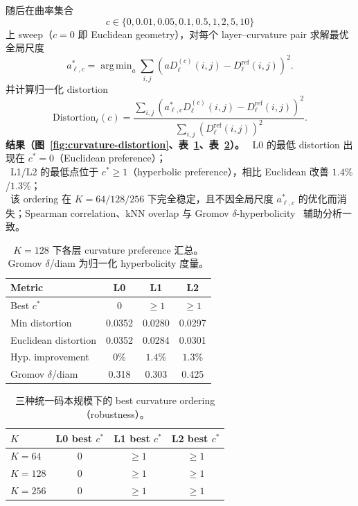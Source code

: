 \documentclass[sigconf, nonacm, anonymize, 9pt]{acmart}
\DeclareMathOperator{\argmin}{arg\,min}
\begin{document}
随后在曲率集合
\begin{equation}
c\in\{0,0.01,0.05,0.1,0.5,1,2,5,10\}
\end{equation}
上 sweep（$c=0$ 即 Euclidean geometry），对每个 layer--curvature pair 求解最优全局尺度
\begin{equation}
a_{\ell,c}^{*}=\argmin_a \sum_{i,j}\left(aD_\ell^{(c)}(i,j)-D_\ell^{\mathrm{ref}}(i,j)\right)^2.
\end{equation}
并计算归一化 distortion
\begin{equation}
\mathrm{Distortion}_{\ell}(c)=\frac{\sum_{i,j}\left(a_{\ell,c}^{*}D_\ell^{(c)}(i,j)-D_\ell^{\mathrm{ref}}(i,j)\right)^2}{\sum_{i,j}\left(D_\ell^{\mathrm{ref}}(i,j)\right)^2}.
\end{equation}
\noindent\textbf{结果（图~\ref{fig:curvature-distortion}、表~\ref{tab:curvature-summary}、表~\ref{tab:curvature-robustness}）。}
\noindent\textbullet\ L0 的最低 distortion 出现在 $c^{*}=0$（Euclidean preference）；\\[2pt]
\noindent\textbullet\ L1/L2 的最低点位于 $c^{*}\geq 1$（hyperbolic preference），相比 Euclidean 改善 $1.4\%$/$1.3\%$；\\[2pt]
\noindent\textbullet\ 该 ordering 在 $K=64/128/256$ 下完全稳定，且不因全局尺度 $a_{\ell,c}^{*}$ 的优化而消失；Spearman correlation、kNN overlap 与 Gromov $\delta$-hyperbolicity~\cite{gromov1987hyperbolic} 辅助分析一致。

\begin{table}[ht]
\centering
\small
\caption{$K=128$ 下各层 curvature preference 汇总。Gromov $\delta$/diam 为归一化 hyperbolicity 度量。}
\label{tab:curvature-summary}
\begin{tabular}{lccc}
\toprule
Metric & L0 & L1 & L2 \\
\midrule
Best $c^{*}$ & $0$ & $\geq 1$ & $\geq 1$ \\
Min distortion & 0.0352 & 0.0280 & 0.0297 \\
Euclidean distortion & 0.0352 & 0.0284 & 0.0301 \\
Hyp. improvement & $0\%$ & $1.4\%$ & $1.3\%$ \\
Gromov $\delta$/diam & 0.318 & 0.303 & 0.425 \\
\bottomrule
\end{tabular}
\end{table}

\begin{table}[ht]
\centering
\small
\caption{三种统一码本规模下的 best curvature ordering（robustness）。}
\label{tab:curvature-robustness}
\begin{tabular}{lccc}
\toprule
$K$ & L0 best $c^{*}$ & L1 best $c^{*}$ & L2 best $c^{*}$ \\
\midrule
$K=64$   & $0$   & $\geq 1$ & $\geq 1$ \\
$K=128$  & $0$   & $\geq 1$ & $\geq 1$ \\
$K=256$  & $0$   & $\geq 1$ & $\geq 1$ \\
\bottomrule
\end{tabular}
\end{table}
\end{document}

